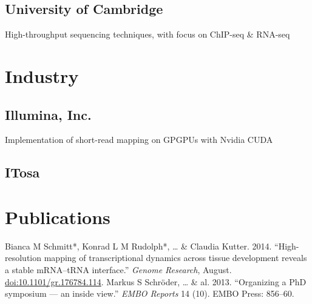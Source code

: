 \documentclass{klmr-cv}
\begin{document}
\subsection{University of Cambridge}

\date{2013--2015}
\item{}
\item{High-throughput sequencing techniques, with focus on ChIP-seq \& RNA-seq}

\section{Industry}

\subsection{Illumina, Inc.}

\date{Oct 2008--Feb 2009}
\item{}
\item{Implementation of short-read mapping on GPGPUs with Nvidia CUDA}

\subsection{ITosa}

\date{Jan 2007--Jan 2008}
\item{}

\section{Publications}


\begin{enumerate}
    \listitem Bianca M Schmitt*, Konrad L M Rudolph*, … \& Claudia Kutter. 2014.
        “High-resolution mapping of transcriptional dynamics across tissue
        development reveals a stable mRNA--tRNA interface.” \textit{Genome
        Research}, August.
        \href{http://dx.doi.org/10.1101/gr.176784.114}{doi:10.1101/gr.176784.114}.
    \listitem Markus S Schröder, … \& al. 2013. “Organizing a PhD symposium ---
        an inside view.” \textit{EMBO Reports} 14 (10). EMBO Press: 856--60.
\end{enumerate}
\end{document}
